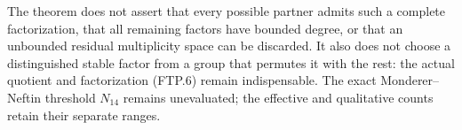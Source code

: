 The theorem does not assert that every possible partner admits such
a complete factorization, that all remaining factors have bounded
degree, or that an unbounded residual multiplicity space can be
discarded.  It also does not choose a distinguished stable factor
from a group that permutes it with the rest: the actual quotient
and factorization (FTP.6) remain indispensable.  The exact
Monderer--Neftin threshold \(N_{14}\) remains unevaluated; the
effective and qualitative counts retain their separate ranges.
